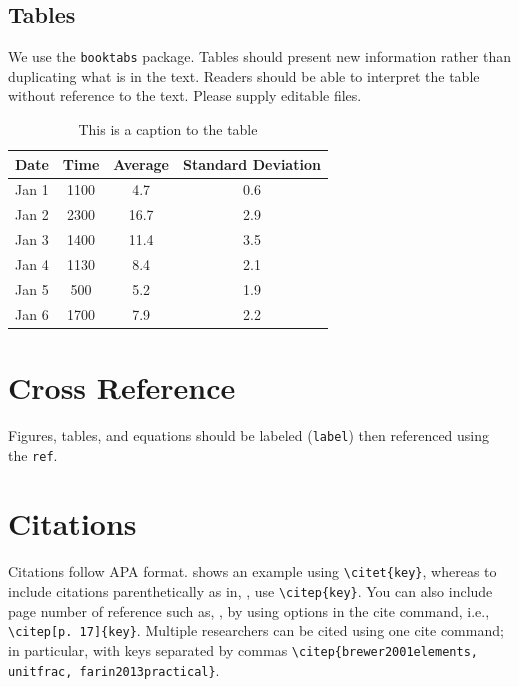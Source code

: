 \subsection{Tables}
We use the \texttt{booktabs} package.  Tables should present new information rather than duplicating what is in the text. Readers should be able to interpret the table without reference to the text. Please supply editable files.


\begin{table}[ht!]
\begin{center}
\begin{tabular}{lccc} 
	\toprule
	Date & Time  &  Average   & Standard Deviation \\ 
	\midrule
	Jan 1  & 1100	& 4.7		& 0.6		\\
	Jan 2  & 2300	& 16.7	& 2.9		\\
	Jan 3  & 1400	& 11.4	& 3.5		\\
	Jan 4  & 1130	& 8.4		& 2.1		\\
	Jan 5  & 500	& 5.2		& 1.9		\\
	Jan 6  & 1700	& 7.9		& 2.2		\\
	\bottomrule 
\end{tabular} 
\caption{This is a caption to the table}
\label{tab:1} 
\end{center}
\end{table} %



\section{Cross Reference}
Figures, tables, and equations should be labeled (\texttt{label}) then referenced using the \texttt{ref}. 


\section{Citations}
Citations follow APA format.  \citet{brewer2001elements} shows an example using \verb!\citet{key}!, whereas to include citations parenthetically as in, \citep{brewer2001elements}, use \verb!\citep{key}!.  You can also include page number of reference such as, \citep[p. 17]{brewer2001elements}, by using options in the cite command, i.e.,  \verb!\citep[p. 17]{key}!.  Multiple researchers \citep{brewer2001elements, article:unitfrac, farin2013practical} can be cited using one cite command; in particular, with keys separated by commas  \verb!\citep{brewer2001elements, unitfrac, farin2013practical}!.



